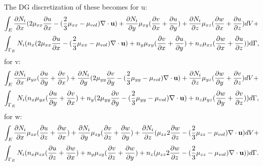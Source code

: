 The DG discretization of these becomes
for u:
\begin{equation}
\int_E
\frac{\partial N_i}{\partial x} (2\mu_{xx}
\frac{\partial u}{\partial x}
-(\frac{2}{3}\mu_{xx}-\mu_{vol})\nabla\cdot{\bf u}
)
+
\frac{\partial N_i}{\partial y} \mu_{xy}
(
\frac{\partial v}{\partial x}+\frac{\partial u}{\partial y})
+
\frac{\partial N_i}{\partial z} \mu_{xz}
(
\frac{\partial w}{\partial x}+\frac{\partial u}{\partial z})
 dV+
\label{visc-stress-u-Ni}
\end{equation}
\begin{equation}
\int_{\Gamma_E}
N_i (n_x (2\mu_{xx}
\frac{\partial u}{\partial x}
-(\frac{2}{3}\mu_{xx}-\mu_{vol})\nabla\cdot{\bf u}
)
+
 {n_y} \mu_{xy}
(
\frac{\partial v}{\partial x}+\frac{\partial u}{\partial y})
+
{n_z} \mu_{xz}
(
\frac{\partial w}{\partial x}+\frac{\partial u}{\partial z})
 )\mathrm{d}\Gamma,
\label{visc-stress-u-n}
\end{equation}
for v:
\begin{equation}
\int_E
\frac{\partial N_i}{\partial x} \mu_{yx}
(
\frac{\partial u}{\partial y}+\frac{\partial v}{\partial x}
)
+
\frac{\partial N_i} {\partial y}(2\mu_{yy}
\frac{\partial v}{\partial y}
-(\frac{2}{3}\mu_{yy}-\mu_{vol})\nabla\cdot{\bf u}
)
+
\frac{\partial N_i}{\partial z} \mu_{yz}
(
\frac{\partial w}{\partial y}+\frac{\partial v}{\partial z})
 dV+
\label{visc-stress-v-Ni}
\end{equation}
\begin{equation}
\int_{\Gamma_E}
N_i({n_x} \mu_{yx}
(
\frac{\partial u}{\partial y}+\frac{\partial v}{\partial x}
)
+
{n_y}(2\mu_{yy}
\frac{\partial v}{\partial y}
-(\frac{2}{3}\mu_{yy}-\mu_{vol})\nabla\cdot{\bf u}
)
+
{n_z} \mu_{yz}
(
\frac{\partial w}{\partial y}+\frac{\partial v}{\partial z})
 )d\Gamma,
\label{visc-stress-v-n}
\end{equation}
for w:
\begin{equation}
\int_E
\frac{\partial N_i}{\partial x} \mu_{zx}
(
\frac{\partial u}{\partial z}+\frac{\partial w}{\partial x})
+
\frac{\partial N_i}{\partial y} \mu_{zy}
(
\frac{\partial v}{\partial z}+\frac{\partial w}{\partial y})
+
\frac{\partial N_i}{\partial z} (\mu_{zz}
2\frac{\partial w}{\partial z}
-(\frac{2}{3}\mu_{zz}-\mu_{vol})\nabla\cdot{\bf u}
) dV  +
\label{visc-stress-w-Ni}
\end{equation}
\begin{equation}
\int_{\Gamma_E}
N_i ({n_x} \mu_{zx}
(
\frac{\partial u}{\partial z}+\frac{\partial w}{\partial x})
+
{n_y} \mu_{zy}
(
\frac{\partial v}{\partial z}+\frac{\partial w}{\partial y})
+
{n_z}  (\mu_{zz}
2\frac{\partial w}{\partial z}
-(\frac{2}{3}\mu_{zz}-\mu_{vol})\nabla\cdot{\bf u}
)  )d\Gamma.
\label{visc-stress-w-n}
\end{equation}
